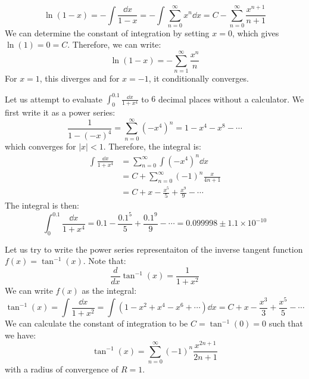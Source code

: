 \begin{itemize}
\begin{example}
        \begin{equation}
            \ln(1-x) = -\int \frac{\dd{x}}{1-x} = -\int \sum_{n=0}^\infty x^n \dd{x} = C - \sum_{n=0}^\infty \frac{x^{n+1}}{n+1}
        \end{equation}
        We can determine the constant of integration by setting $x=0$, which gives $\ln(1)=0=C$. Therefore, we can write:
        \begin{equation}
            \ln(1-x) = -\sum_{n=1}^\infty \frac{x^n}{n}
        \end{equation}
        For $x=1$, this diverges and for $x=-1$, it conditionally converges.
    \end{example}
    \begin{example}
        Let us attempt to evaluate $\int_0^{0.1} \frac{\dd{x}}{1+x^4}$ to $6$ decimal places without a calculator. We first write it as a power series:
        \begin{equation}
            \frac{1}{1-(-x)^4} = \sum_{n=0}^\infty (-x^4)^n = 1-x^4-x^8- \cdots 
        \end{equation}
        which converges for $|x|<1$. Therefore, the integral is:
        \begin{align}
            \int \frac{\dd{x}}{1+x^4} &= \sum_{n=0}^\infty \int (-x^4)^n \dd{x} \\ 
            &= C + \sum_{n=0}^\infty (-1)^n \frac{x}{4n+1} \\ 
            &= C + x - \frac{x^5}{5} + \frac{x^9}{9} - \cdots 
        \end{align}
        The integral is then:
        \begin{equation}
            \int_{0}^{0.1} \frac{\dd{x}}{1+x^4} = 0.1 - \frac{0.1^5}{5} + \frac{0.1^9}{9} - \cdots = 0.099998 \pm 1.1 \times 10^{-10}
        \end{equation}
    \end{example}
    \begin{example}
        Let us try to write the power series representaiton of the inverse tangent function $f(x)=\tan^{-1}(x)$. Note that:
        \begin{equation}
            \frac{d}{dx}\tan^{-1}(x) = \frac{1}{1+x^2}
        \end{equation}
        We can write $f(x)$ as the integral:
        \begin{equation}
            \tan^{-1}(x) = \int \frac{\dd{x}}{1+x^2} = \int (1-x^2+x^4-x^6 +\cdots) \dd{x} = C + x - \frac{x^3}{3} + \frac{x^5}{5} - \cdots
        \end{equation}
        We can calculate the constant of integration to be $C=\tan^{-1}(0)=0$ such that we have:
        \begin{equation}
            \tan^{-1}(x) = \sum_{n=0}^\infty (-1)^n \frac{x^{2n+1}}{2n+1}
        \end{equation}
        with a radius of convergence of $R=1$.
        \vspace{2mm}


\end{example}
\end{itemize}
